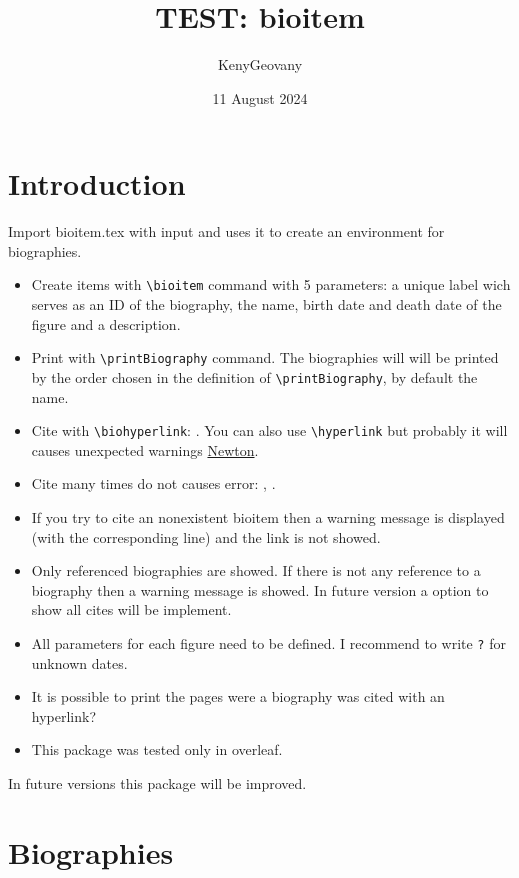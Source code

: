 \documentclass{article}
\title{TEST: bioitem}
\author{KenyGeovany}
\date{11 August 2024}
\begin{document}
\maketitle

\section{Introduction}
Import bioitem.tex with input and uses it to create an environment for biographies. 

\begin{itemize}
    \item Create items with \verb|\bioitem| command with 5 parameters: a unique label wich serves as an ID of the biography, the name, birth date and death date of the figure and a description.
    \item Print with \verb|\printBiography| command. The biographies will will be printed by the order chosen in the definition of \verb|\printBiography|, by default the name.
    \item Cite with \verb|\biohyperlink|: . You can also use \verb|\hyperlink| but probably it will causes unexpected warnings \hyperlink{bioNewton}{Newton}.
    \item Cite many times do not causes error: , .
    \item If you try to cite an nonexistent bioitem then a warning message is displayed (with the corresponding line) and the link is not showed.
    \item Only referenced biographies are showed. If there is not any reference to a biography then a warning message is showed. In future version a option to show all cites will be implement.
    \item All parameters for each figure need to be defined. I recommend to write \verb|?| for unknown dates.
    \item It is possible to print the pages were a biography was cited with an hyperlink?
    \item This package was tested only in overleaf.
\end{itemize}

In future versions this package will be improved.

\section{Biographies}

\printBiography
\end{document}
